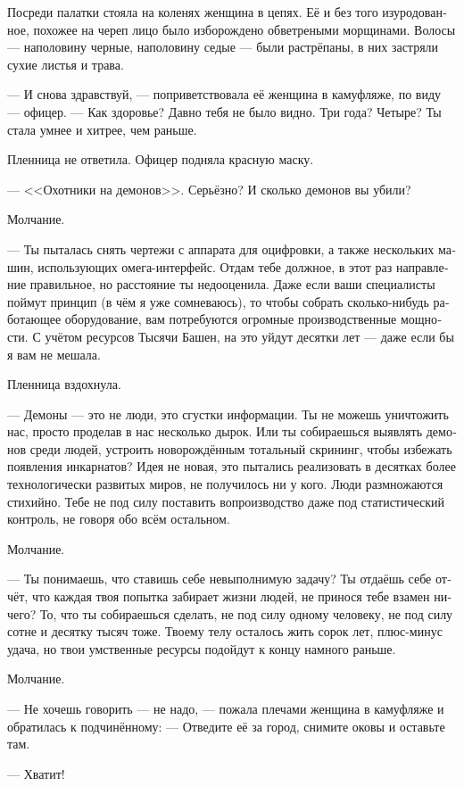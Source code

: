 \documentclass[a4paper,12pt,fleqn]{book}\usepackage{polyglossia}\setdefaultlanguage[babelshorthands=true]{russian}\setotherlanguage{english}\defaultfontfeatures{Ligatures=TeX,Mapping=tex-text}\usepackage{xcolor}\newcommand{\ml}[3]{#2}
\begin{document}
Посреди палатки стояла на коленях женщина в цепях.
Её и без того изуродованное, похожее на череп лицо было изборождено обветреными морщинами.
Волосы --- наполовину черные, наполовину седые --- были растрёпаны, в них застряли сухие листья и трава.

--- И снова здравствуй, --- поприветствовала её женщина в камуфляже, по виду --- офицер.
--- Как здоровье?
Давно тебя не было видно.
Три года?
Четыре?
Ты стала умнее и хитрее, чем раньше.

Пленница не ответила.
Офицер подняла красную маску.

--- <<Охотники на демонов>>.
Серьёзно?
И сколько демонов вы убили?

Молчание.

--- Ты пыталась снять чертежи с аппарата для оцифровки, а также нескольких машин, использующих омега-интерфейс.
Отдам тебе должное, в этот раз направление правильное, но расстояние ты недооценила.
Даже если ваши специалисты поймут принцип (в чём я уже сомневаюсь), то чтобы собрать сколько-нибудь работающее оборудование, вам потребуются огромные производственные мощности.
С учётом ресурсов Тысячи Башен, на это уйдут десятки лет --- даже если бы я вам не мешала.

Пленница вздохнула.

--- Демоны --- это не люди, это сгустки информации.
Ты не можешь уничтожить нас, просто проделав в нас несколько дырок.
Или ты собираешься выявлять демонов среди людей, устроить новорождённым тотальный скрининг, чтобы избежать появления инкарнатов?
Идея не новая, это пытались реализовать в десятках более технологически развитых миров, не получилось ни у кого.
Люди размножаются стихийно.
Тебе не под силу поставить вопроизводство даже под статистический контроль, не говоря обо всём остальном.

Молчание.

--- Ты понимаешь, что ставишь себе невыполнимую задачу?
Ты отдаёшь себе отчёт, что каждая твоя попытка забирает жизни людей, не принося тебе взамен ничего?
То, что ты собираешься сделать, не под силу одному человеку, не под силу сотне и десятку тысяч тоже.
Твоему телу осталось жить сорок лет, плюс-минус удача, но твои умственные ресурсы подойдут к концу намного раньше.

Молчание.

--- Не хочешь говорить --- не надо, --- пожала плечами женщина в камуфляже и обратилась к подчинённому:
--- Отведите её за город, снимите оковы и оставьте там.

--- Хватит!
\end{document}
